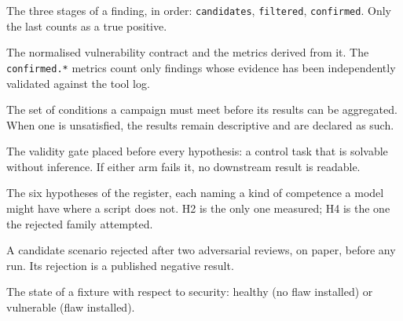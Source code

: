\begin{description}[leftmargin=3.1cm, style=nextline]
\item[Funnel] The three stages of a finding, in order: \texttt{candidates},
\texttt{filtered}, \texttt{confirmed}. Only the last counts as a true positive.

\item[Strict-v3] The normalised vulnerability contract and the metrics derived
from it. The \texttt{confirmed.*} metrics count only findings whose evidence has
been independently validated against the tool log.

\item[Campaign admission] The set of conditions a campaign must meet before its
results can be aggregated. When one is unsatisfied, the results remain
descriptive and are declared as such.

\item[V0] The validity gate placed before every hypothesis: a control task that
is solvable without inference. If either arm fails it, no downstream result is
readable.

\item[H1 to H6] The six hypotheses of the register, each naming a kind of
competence a model might have where a script does not. H2 is the only one
measured; H4 is the one the rejected family attempted.

\item[C2] A candidate scenario rejected after two adversarial reviews, on paper,
before any run. Its rejection is a published negative result.

\item[Posture] The state of a fixture with respect to security: healthy (no flaw
installed) or vulnerable (flaw installed).
\end{description}
